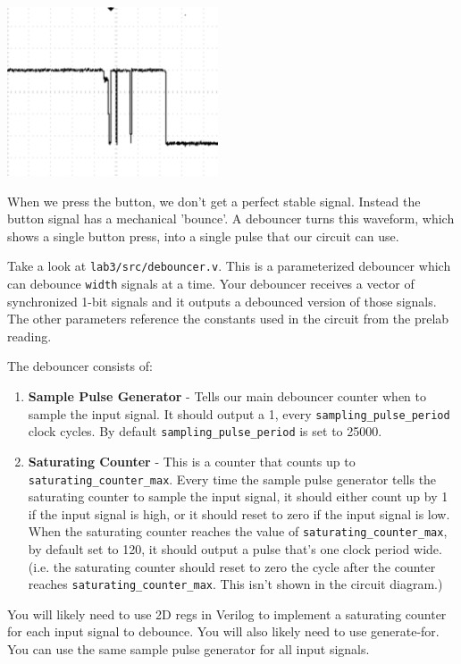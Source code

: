 \documentclass[11pt]{article}
\begin{document}
\begin{center}
\includegraphics[height=5cm]{images/lab2_fig4.png}
\end{center}

When we press the button, we don't get a perfect stable signal. Instead the button signal has a mechanical 'bounce'. A debouncer turns this waveform, which shows a single button press, into a single pulse that our circuit can use.

Take a look at \verb|lab3/src/debouncer.v|. This is a parameterized debouncer which can debounce \verb|width| signals at a time. Your debouncer receives a vector of synchronized 1-bit signals and it outputs a debounced version of those signals. The other parameters reference the constants used in the circuit from the prelab reading.

The debouncer consists of:

\begin{enumerate}
	\item \textbf{Sample Pulse Generator} - Tells our main debouncer counter when to sample the input signal. It should output a 1, every \verb|sampling_pulse_period| clock cycles. By default \verb|sampling_pulse_period| is set to 25000.
	
	\item \textbf{Saturating Counter} - This is a counter that counts up to \verb|saturating_counter_max|. Every time the sample pulse generator tells the saturating counter to sample the input signal, it should either count up by 1 if the input signal is high, or it should reset to zero if the input signal is low. When the saturating counter reaches the value of \verb|saturating_counter_max|, by default set to 120, it should output a pulse that's one clock period wide. (i.e. the saturating counter should reset to zero the cycle after the counter reaches \verb|saturating_counter_max|. This isn't shown in the circuit diagram.)
\end{enumerate}

You will likely need to use 2D regs in Verilog to implement a saturating counter for each input signal to debounce. You will also likely need to use generate-for. You can use the same sample pulse generator for all input signals.
\end{document}
